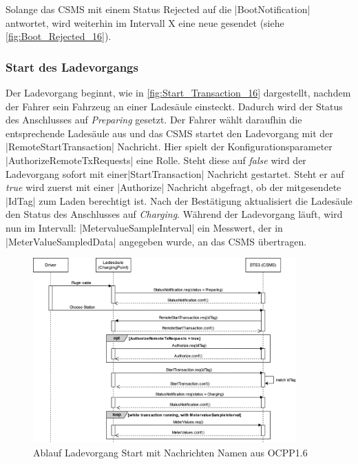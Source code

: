 \noindent Solange das \acs{CSMS} mit einem Status Rejected auf die \spverb|BootNotification| antwortet, wird weiterhin im Intervall X eine neue gesendet (siehe \autoref{fig:Boot_Rejected_16}).
\subsubsection{Start des Ladevorgangs}
Der Ladevorgang beginnt, wie in \autoref{fig:Start_Transaction_16} dargestellt, nachdem der Fahrer sein Fahrzeug an einer Ladesäule einsteckt. Dadurch wird der Status des Anschlusses auf \textit{Preparing} gesetzt. Der Fahrer wählt daraufhin die entsprechende Ladesäule aus und das \acs{CSMS} startet den Ladevorgang mit der \spverb|RemoteStartTransaction| Nachricht. Hier spielt der Konfigurationsparameter  \spverb|AuthorizeRemoteTxRequests| eine Rolle. Steht diese auf \textit{false} wird der Ladevorgang sofort mit einer\spverb|StartTransaction| Nachricht gestartet. Steht er auf \textit{true} wird zuerst mit einer \spverb|Authorize| Nachricht abgefragt, ob der mitgesendete \spverb|IdTag| zum Laden berechtigt ist. Nach der Bestätigung aktualisiert die Ladesäule den Status des Anschlusses auf \textit{Charging}. Während der Ladevorgang läuft, wird nun im Intervall: \spverb|MetervalueSampleInterval| ein Messwert, der in \spverb|MeterValueSampledData| angegeben wurde, an das \acs{CSMS} übertragen.
\begin{figure}[H]
	\centering
	\includegraphics[width=0.9\textwidth]{images/OCPP/Charging_Start_OCPP_v16.drawio.png}
	\caption{Ablauf Ladevorgang Start mit Nachrichten Namen aus OCPP1.6 \cite{Eigene_Darstellung, OCPP-1.6-edition-2}}
	\label{fig:Start_Transaction_16}
\end{figure}

